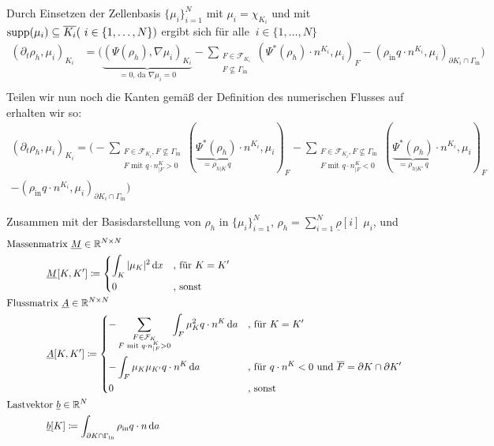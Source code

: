 Durch Einsetzen der Zellenbasis $ \{\mu_i\}_{i=1}^N $ mit $ \mu_i = \chi_{K_i} $  und mit $ \operatorname{supp}(\mu_i) \subseteq \overline{K_i} (\ i \in \{1, \dots , N\})$ ergibt sich für alle $\ i \in \{1, \dots , N\}$ 
\begin{align*}
\left(\partial_t \rho_h, \mu_i  \right)_{K_i}  &= \bigg( \underbrace{(\Psi(\rho_h), \nabla\mu_i)_{K_i}}_{=0 \text{, da } \nabla \mu_i = 0} - \sum_{\substack{F \in \mathcal{F}_{K_i} \\ F \not\subseteq \Gamma_{\text{in}}}} \left(\Psi^*(\rho_h) \cdot n^{K_i}, \mu_i \right)_{F} - \left(\rho_{\text{in}} q \cdot n^{K_i}, \mu_i \right)_{\partial K_i \cap \Gamma_{\text{in}}} \bigg) \\
\end{align*}
Teilen wir nun noch die Kanten gemäß der Definition des numerischen Flusses auf erhalten wir so: 
\begin{align*}
\left(\partial_t \rho_h, \mu_i  \right)_{K_i} = \bigg( - \sum_{\substack{F \in \mathcal{F}_{K_i}, F \not\subseteq \Gamma_{\text{in}}\\ F \text{ mit }q \cdot n^K_{|F} > 0} } \left(\underbrace{\Psi^*(\rho_h)}_{= \rho_{h|K}\, q} \cdot n^{K_i}, \mu_i \right)_{F} - \sum_{\substack{F \in \mathcal{F}_{K_i}, F \not\subseteq \Gamma_{\text{in}}\\ F \text{ mit }q \cdot n^K_{|F} < 0} } \left(\underbrace{\Psi^*(\rho_h)}_{= \rho_{h|K'} \, q} \cdot n^{K_i}, \mu_i \right)_{F}\\
 - \left(\rho_{\text{in}} q \cdot n^{K_i}, \mu_i \right)_{\partial K_i \cap \Gamma_{\text{in}}} \bigg)
\end{align*} 

Zusammen mit der Basisdarstellung von $ \rho_h $ in $\{\mu_i  \}_{i=1}^N$, $ \rho_h = \sum_{i=1}^{N} \underline{\rho}[i] \; \mu_i$, und 
\begin{align*}
&\text{Massenmatrix } \underline{M}\in \mathbb{R}^{N \times N} \\  &\qquad \qquad \underline{M}[K,K'] \coloneqq \begin{dcases}
\int_K | \mu_K |^2 \, \mathrm{d} x & \text{, für } K = K' \\
0 &\text{, sonst}
\end{dcases} \\
&\text{Flussmatrix } \underline{A}\in \mathbb{R}^{N \times N} \\ &\qquad \qquad \underline{A}[K,K'] \coloneqq \begin{dcases}
- \sum_{\substack{F\in \mathcal{F}_K \\ F \text{ mit } q\cdot n^K_{|F} > 0}} \int_F \mu_K^2 q \cdot n^K \, \mathrm{d} a& \text{, für } K = K' \\
- \int_F \mu_K \mu_{K'} q \cdot n^K \, \mathrm{d} a &\text{, für } q \cdot n^K< 0 \text{ und } \overline{F} = \partial K \cap \partial K'\\
0 &\text{, sonst}
\end{dcases} \\
&\text{Lastvektor } \underline{b}\in \mathbb{R}^{N} \\ &\qquad \qquad\underline{b}[K] \coloneqq \int_{\partial K \cap \Gamma_{\text{in}}} \rho_{\text{in}} q \cdot n \, \mathrm{d} a
\end{align*}


